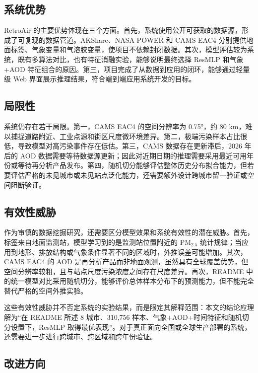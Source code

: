\documentclass[UTF8,zihao=-4,a4paper]{ctexart}
\newcommand{\pmfine}{PM$_{2.5}$}
\newcommand{\aod}{AOD}
\begin{document}
\subsection{系统优势}

RetroAir 的主要优势体现在三个方面。首先，系统使用公开可获取的数据源，形成了可复现的数据管道。AKShare、NASA POWER 和 CAMS EAC4 分别提供地面标签、气象变量和气溶胶变量，使项目不依赖封闭数据。其次，模型评估较为系统，既有多算法对比，也有特征消融实验，能够说明最终选择 ResMLP 和气象+\aod{} 特征组合的原因。第三，项目完成了从数据到应用的闭环，能够通过轻量级 Web 界面展示推理结果，符合端到端应用系统开发的目标。

\subsection{局限性}

系统仍存在若干局限。第一，CAMS EAC4 的空间分辨率为 0.75°，约 80 km，难以捕捉道路附近、工业点源和街区尺度微环境差异。第二，极端污染样本占比很低，导致模型对高污染事件存在低估。第三，CAMS 数据存在更新滞后，2026 年后的 \aod{} 数据需要等待数据源更新；因此对近期日期的推理需要采用最近可用年份或等待再分析产品发布。第四，随机切分能够评估整体历史分布拟合能力，但若要评估严格的未见城市或未见站点泛化能力，还需要额外设计跨城市留一验证或空间阻断验证。

\subsection{有效性威胁}

作为审慎的数据挖掘研究，还需要区分模型效果和系统有效性的潜在威胁。首先，标签来自地面监测站，模型学习到的是监测站位置附近的 \pmfine{} 统计规律；当应用到地形、排放结构或气象条件显著不同的区域时，外推误差可能增加。其次，CAMS EAC4 的 \aod{} 是再分析产品而非地面观测，虽然具有全球覆盖优势，但空间分辨率较粗，且与站点尺度污染浓度之间存在尺度差异。再次，README 中的统一模型对比采用随机切分，能够评价总体样本分布下的预测能力，但不能完全替代严格的空间外推实验。

这些有效性威胁并不否定系统的实验结果，而是限定其解释范围：本文的结论应理解为“在 README 所述 8 城市、310,756 样本、气象+\aod{}+时间特征和随机切分设置下，ResMLP 取得最优表现”。对于真正面向全国或全球生产部署的系统，还需要进一步进行跨城市、跨区域和跨年份验证。

\subsection{改进方向}
\end{document}
